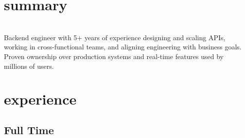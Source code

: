 \documentclass[a4paper,nocolors]{friggeri-cv}
\begin{document}
\section{summary}
\vspace{1em}
\\
Backend engineer with 5+ years of experience designing and scaling APIs, working in cross-functional teams, and aligning engineering with business goals. Proven ownership over production systems and real-time features used by millions of users.
\vspace{0.5em}

\section{experience}

\subsection{Full Time}
\end{document}
